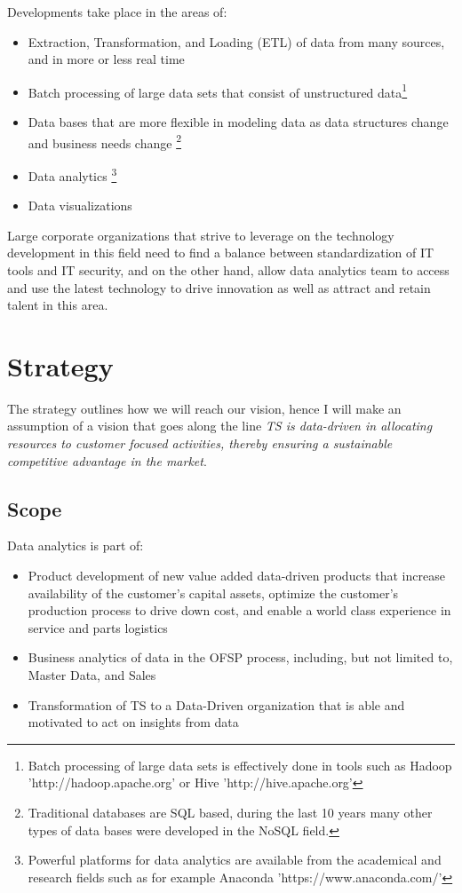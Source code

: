 \documentclass[10pt]{article} %
\begin{document}
Developments take place in the areas of:
\begin{itemize}
				\item Extraction, Transformation, and Loading (ETL) of data from many sources, and in more or less real time
				\item Batch processing of large data sets that consist of unstructured data\footnote{Batch processing of large data sets is effectively done in tools such as Hadoop 'http://hadoop.apache.org' or Hive 'http://hive.apache.org'}
				\item Data bases that are more flexible in modeling data as data structures change and business needs change \footnote{Traditional databases are SQL based, during the last 10 years many other types of data bases were developed in the NoSQL field.}
				\item Data analytics \footnote{Powerful platforms for data analytics are available from the academical and research fields such as for example Anaconda 'https://www.anaconda.com/'}
				\item Data visualizations
\end{itemize}

Large corporate organizations that strive to leverage on the technology development in this field need to find a balance between standardization of IT tools and IT security, and on the other hand, allow data analytics team to access and use the latest technology to drive innovation as well as attract and retain talent in this area.

\section{Strategy}
The strategy outlines how we will reach our vision, hence I will make an assumption of a vision that goes along the line \textit{TS is data-driven in allocating resources to customer focused activities, thereby ensuring a sustainable competitive advantage in the market}.

\subsection{Scope}

Data analytics is part of:
\begin{itemize}
			\item Product development of new value added data-driven products that increase availability of the customer's capital assets, optimize the customer's production process to drive down cost, and enable a world class experience in service and parts logistics 	
			\item Business analytics of data in the OFSP process, including, but not limited to, Master Data, and Sales 
			\item  Transformation of TS to a Data-Driven organization that is able and motivated to act on insights from data 
\end{itemize}
\end{document}
